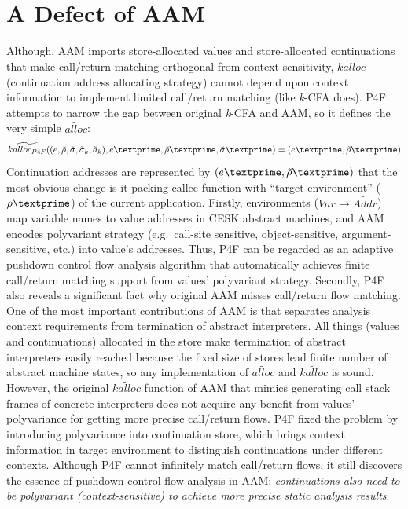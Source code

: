 \documentclass[12pt]{report}
\begin{document}
\section{A Defect of AAM}
\label{sub:Defect}
Although, AAM imports store-allocated values and store-allocated continuations that make call/return matching orthogonal from context-sensitivity, $\widetilde{kalloc}$ (continuation address allocating strategy) cannot depend upon context information to implement limited call/return matching (like \textit{k}-CFA does).
P4F attempts to narrow the gap between original \textit{k}-CFA and AAM, so it defines the very simple $\widetilde{alloc}$:
\[
\widetilde{kalloc_{P4F}} ((e, \tilde{\rho}, \tilde{\sigma}, \tilde{\sigma}_k, \tilde{a}_k), e\textprime, \tilde{\rho}\textprime, \tilde{\sigma}\textprime) = (e\textprime, \tilde{\rho}\textprime)
\]
Continuation addresses are represented by $(e\textprime, \tilde{\rho}\textprime)$ that the most obvious change is it packing callee function with ``target environment'' ($\tilde{\rho}\textprime$) of the current application.
Firstly, environments ($Var \to \widetilde{Addr}$) map variable names to value addresses in CESK abstract machines, and AAM encodes polyvariant strategy (e.g.\ call-site sensitive, object-sensitive, argument-sensitive, etc.) into value's addresses.
Thus, P4F can be regarded as an adaptive pushdown control flow analysis algorithm that automatically achieves finite call/return matching support from values' polyvariant strategy. %
Secondly, P4F also reveals a significant fact why original AAM misses call/return flow matching.
One of the most important contributions of AAM is that separates analysis context requirements from termination of abstract interpreters.
All things (values and continuations) allocated in the store make termination of abstract interpreters easily reached because the fixed size of stores lead finite number of abstract machine states, so any implementation of $\widetilde{alloc}$ and $\widetilde{kalloc}$ is sound.
However, the original $\widetilde{kalloc}$ function of AAM that mimics generating call stack frames of concrete interpreters does not acquire any benefit from values' polyvariance for getting more precise call/return flows.
P4F fixed the problem by introducing polyvariance into continuation store, which brings context information in target environment to distinguish continuations under different contexts.
Although P4F cannot infinitely match call/return flows, it still discovers the essence of pushdown control flow analysis in AAM\@: \emph{continuations also need to be polyvariant (context-sensitive) to achieve more precise static analysis results}.
\end{document}
